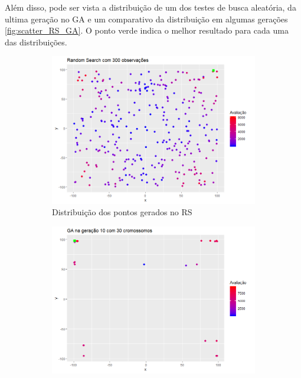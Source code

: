 Além disso, pode ser vista a distribuição de um dos testes de busca aleatória, da ultima geração no GA e um comparativo da distribuição em algumas gerações \autoref{fig:scatter_RS_GA}. O ponto verde indica o melhor resultado para cada uma das distribuições. 

\begin{figure}[ht]
	\centering
	\begin{subfigure}[b]{0.47\linewidth}
		\includegraphics[width=\linewidth]{imagens/scatter_rs_P30_T10.png}
		\caption{Distribuição dos pontos gerados no RS}
	\end{subfigure}
	\begin{subfigure}[b]{0.47\linewidth}
		\includegraphics[width=\linewidth]{imagens/scatter_GA_P30_T10.png}

\end{subfigure}
\end{figure}
